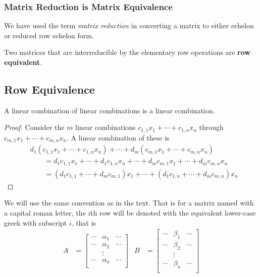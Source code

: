 \subsubsection{Matrix Reduction is Matrix Equivalence} 

We have used the term \emph{matrix reduction} in converting a matrix to either echelon or reduced row echelon form.  

\begin{definition}
Two matrices that are interreducible by the elementary row operations are \textbf{row equivalent}.
\end{definition}


\subsection{Row Equivalence}

\begin{lemma}
A linear combination of linear combinations is a linear combination.
\end{lemma}

\begin{proof}
Consider the $m$  linear combinations $c_{1,1} x_1 + \cdots + c_{1,n} x_n$ through $c_{m,1} x_1 + \cdots + c_{m,n} x_n$.  A linear combination of these is
%
\begin{align*}
& d_1 (c_{1,1} x_1 + \cdots + c_{1,n} x_n ) + \cdots + d_m (c_{m,1} x_1 + \cdots + c_{m,n} x_n) \\
& \qquad = d_1 c_{1,1} x_1 + \cdots + d_1 c_{1,n} x_n + \cdots + d_m c_{m,1} x_1 + \cdots + d_m c_{m,n} x_n \\
& \qquad = (d_1 c_{1,1} + \cdots + d_m c_{m,1}) x_1 + \cdots + (d_1 c_{1,n} + \cdots + d_m c_{m,n}) x_n 
\end{align*}
\end{proof}

We will use the same convention as in the text.  That is for a matrix named with a capital roman letter, the $i$th row will be denoted with the equivalent lower-case greek with subscript $i$, that is
%
\begin{align*}
A & = \begin{bmatrix}
\cdots & \alpha_1 & \cdots \\
\cdots & \alpha_2 & \cdots \\
& \vdots & \\
\cdots & \alpha_n & \cdots \\
\end{bmatrix} & 
B & = \begin{bmatrix}
\cdots & \beta_1 & \cdots \\
\cdots & \beta_2 & \cdots \\
& \vdots & \\
\cdots & \beta_n & \cdots \\
\end{bmatrix} 
\end{align*}


